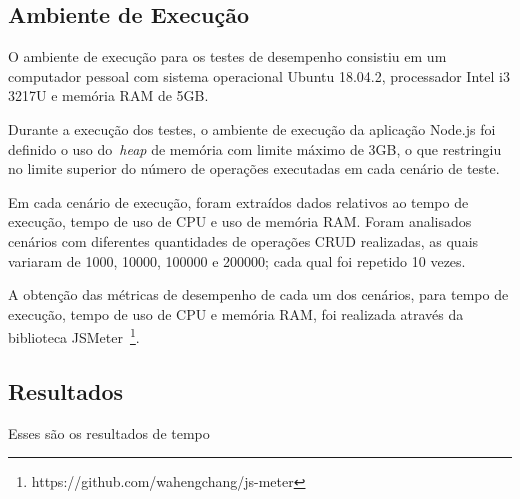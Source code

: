 \documentclass[12pt]{article}
\begin{document}
\subsection{Ambiente de Execução}

O ambiente de execução para os testes de desempenho consistiu em um computador pessoal com sistema operacional Ubuntu 18.04.2, processador Intel i3 3217U e memória RAM de 5GB. 

Durante a execução dos testes, o ambiente de execução da aplicação Node.js foi definido o uso do~\emph{heap} de memória com limite máximo de 3GB, o que restringiu no limite superior do número de operações executadas em cada cenário de teste.

Em cada cenário de execução, foram extraídos dados relativos ao tempo de execução, tempo de uso de CPU e uso de memória RAM.
Foram analisados cenários com diferentes quantidades de operações CRUD realizadas, as quais variaram de 1000, 10000, 100000 e 200000; cada qual foi repetido 10 vezes. 

A obtenção das métricas de desempenho de cada um dos cenários, para tempo de execução, tempo de uso de CPU e memória RAM, foi realizada através da biblioteca JSMeter~\footnote{https://github.com/wahengchang/js-meter}.

\subsection{Resultados}
\label{section:resultados}


Esses são os resultados de tempo
\end{document}
